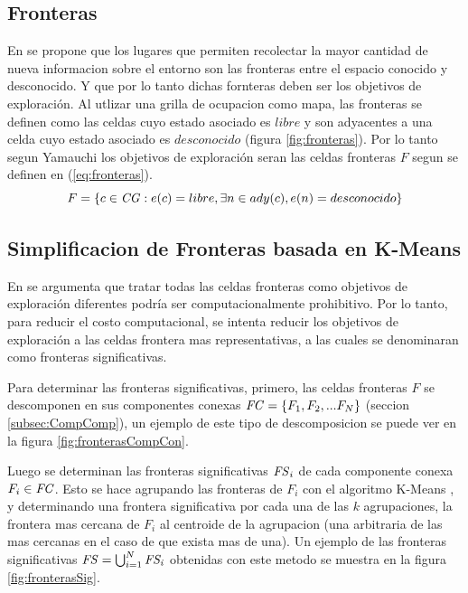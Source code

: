\subsection{Fronteras}
En \cite{yamauchi1998frontier} se propone que los lugares que permiten
recolectar la mayor cantidad de nueva informacion sobre el entorno son las
fronteras entre el espacio conocido y desconocido. Y que por lo tanto dichas
fornteras deben ser los objetivos de exploración.
Al utlizar una grilla de ocupacion como mapa, las fronteras se definen como las
celdas cuyo estado asociado es $libre$ y son adyacentes a una celda cuyo estado
asociado es $desconocido$ (figura \ref{fig:fronteras}).
Por lo tanto segun Yamauchi los objetivos de exploración seran las celdas
fronteras $F$ segun se definen en (\ref{eq:fronteras}).
\begin{equation} 
  F = \{ c \in \mathit{CG} : e(c) = libre, \exists n \in ady(c), e(n) = desconocido  \}
  \label{eq:fronteras}
\end{equation}

\subsection{Simplificacion de Fronteras basada en K-Means}
En \cite{amorin2019novel} se argumenta que tratar todas las celdas fronteras
como objetivos de exploración diferentes podría ser computacionalmente
prohibitivo. Por lo tanto, para reducir el costo computacional, se intenta
reducir los objetivos de exploración a las celdas frontera mas representativas,
a las cuales se denominaran como fronteras significativas.

Para determinar las fronteras significativas, primero, las celdas fronteras $F$
se descomponen en sus componentes conexas $\mathit{FC}=\{F_1,F_2,...F_N\}$
(seccion \ref{subsec:CompComp}), un ejemplo de este tipo de descomposicion se
puede ver en la figura \ref{fig:fronterasCompCon}.

Luego se determinan las fronteras significativas $\mathit{FS}_i$ de cada
componente conexa $F_i\in \mathit{FC}$. Esto se hace agrupando las fronteras de
$F_i$ con el algoritmo K-Means \cite{macqueen1967some}, y determinando una
frontera significativa por cada una de las $k$ agrupaciones, la
frontera mas cercana de $F_i$ al centroide de la agrupacion (una arbitraria de
las mas cercanas en el caso de que exista mas de una). Un ejemplo de las
fronteras significativas  $\mathit{FS} = \bigcup_{i=1}^N \mathit{FS_i}$ obtenidas con
este metodo se muestra en la figura \ref{fig:fronterasSig}.

